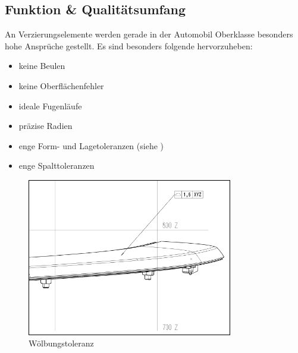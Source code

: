 \documentclass[12pt,a4paper,parskip]{scrartcl}
\begin{document}
	 	 
\subsection{Funktion \& Qualitätsumfang}
An Verzierungselemente werden gerade in der Automobil Oberklasse besonders hohe Ansprüche gestellt. Es sind besonders folgende hervorzuheben:
\begin{itemize}
\item keine Beulen
\item keine Oberflächenfehler
\item ideale Fugenläufe
\item präzise Radien
\item enge Form- und Lagetoleranzen (siehe )
\item enge Spalttoleranzen
\end{itemize}
\begin{figure}[hbtp]
  \centering
  \includegraphics[width=0.8\textwidth]{vdkdtol}
  \caption{Wölbungstoleranz}
  \label{fig:vdkdtol}
  \end{figure}
\end{document}
